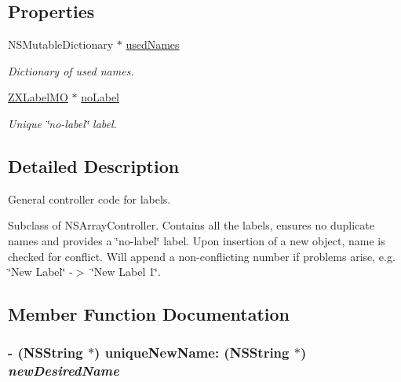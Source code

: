 \subsection*{Properties}
\begin{CompactItemize}
\item 
NSMutableDictionary $\ast$ \hyperlink{interface_z_x_label_controller_3ccce02a168774242989b7c30294660e}{usedNames}
\begin{CompactList}\small\item\em Dictionary of used names. \item\end{CompactList}\item 
\hyperlink{interface_z_x_label_m_o}{ZXLabelMO} $\ast$ \hyperlink{interface_z_x_label_controller_f14ea66b07ab427e79c1f0a7772288fd}{noLabel}
\begin{CompactList}\small\item\em Unique \char`\"{}no-label\char`\"{} label. \item\end{CompactList}\end{CompactItemize}


\subsection{Detailed Description}
General controller code for labels. 

Subclass of NSArrayController. Contains all the labels, ensures no duplicate names and provides a \char`\"{}no-label\char`\"{} label. Upon insertion of a new object, name is checked for conflict. Will append a non-conflicting number if problems arise, e.g. \char`\"{}New Label\char`\"{} -$>$ \char`\"{}New Label 1\char`\"{}. 

\subsection{Member Function Documentation}
\hypertarget{interface_z_x_label_controller_e223bf8f8bc63f53f0790b34050fee97}{
\subsubsection[{uniqueNewName:}]{\setlength{\rightskip}{0pt plus 5cm}- (NSString $\ast$) uniqueNewName: (NSString $\ast$) {\em newDesiredName}}}
\label{interface_z_x_label_controller_e223bf8f8bc63f53f0790b34050fee97}


